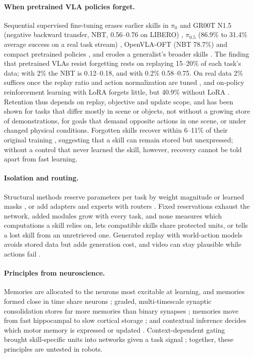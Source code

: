 \documentclass[11pt]{article}
\begin{document}
\paragraph{When pretrained VLA policies forget.} Sequential supervised fine-tuning erases earlier skills in $\pi_0$ and
GR00T N1.5 (negative backward transfer, NBT, 0.56--0.76 on LIBERO) \citep{liu2026pretrained}, $\pi_{0.5}$ (86.9\% to
31.4\% average success on a real task stream) \citep{zhu2026realworld}, OpenVLA-OFT (NBT 78.7\%) \citep{hu2026simple} and
compact pretrained policies \citep{romer2026clare,gu2026limode}, and erodes a generalist's broader skills
\citep{yadav2026retain}. The finding that pretrained VLAs resist forgetting \citep{liu2026pretrained} rests on replaying
15--20\% of each task's data; with 2\% the NBT is 0.12--0.18, and with 0.2\% 0.58--0.75. On real data 2\% suffices once
the replay ratio and action normalization are tuned \citep{zhu2026realworld}, and on-policy reinforcement learning with
LoRA forgets little, but 40.9\% without LoRA \citep{hu2026simple}. Retention thus depends on replay, objective and update
scope, and has been shown for tasks that differ mostly in scene or objects, not without a growing store of
demonstrations, for goals that demand opposite actions in one scene, or under changed physical conditions. Forgotten skills recover within 6--11\% of their original training \citep{liu2026pretrained}, suggesting
that a skill can remain stored but unexpressed; without a control that never learned the skill, however, recovery
cannot be told apart from fast learning.

\paragraph{Isolation and routing.} Structural methods reserve parameters per task by weight magnitude
\citep{mallya2018packnet} or learned masks \citep{serra2018hat}, or add adapters and experts with routers
\citep{liu2024tail,lei2025dmpel,romer2026clare,gu2026limode}. Fixed reservations
exhaust the network, added modules grow with every task, and none measures which computations a skill relies on, lets
compatible skills share protected units, or tells a lost skill from an unretrieved one. Generated replay with
world-action models avoids stored data \citep{govind2026regen,fang2026r2wam,lin2026rifar} but adds generation cost, and video
can stay plausible while actions fail \citep{fang2026r2wam}.

\paragraph{Principles from neuroscience.} Memories are allocated to the neurons most excitable at learning, and
memories formed close in time share neurons \citep{josselyn2020,cai2016}; graded, multi-timescale synaptic consolidation
stores far more memories than binary synapses \citep{benna2016}; memories move from fast hippocampal to slow cortical
storage \citep{mcclelland1995}; and contextual inference decides which motor memory is expressed or updated
\citep{heald2021}. Context-dependent gating brought skill-specific units into
networks given a task signal \citep{masse2018}; together, these principles are untested in robots.
\end{document}
